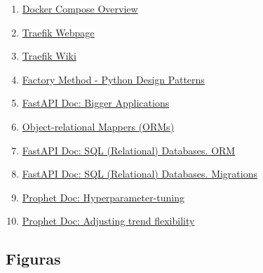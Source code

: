 \documentclass[a4paper, oneside, 12pt]{book}
\begin{document}
\begin{enumerate}
		\item
		\label{bib: docker compose doc}
		\href{https://docs.docker.com/compose/}{Docker Compose Overview}
		
		\item
		\label{bib: traefik webpage}
		\href{https://traefik.io/traefik/}{Traefik Webpage}
		
		\item
		\label{bib: traefik wiki}
		\href{https://doc.traefik.io/traefik/}{Traefik Wiki}
		
		\item
		\label{bib: factory method}
		\href{https://www.geeksforgeeks.org/factory-method-python-design-patterns/}{Factory Method - Python Design Patterns}
		
		\item
		\label{bib: fastapi doc bigger apps}
		\href{https://fastapi.tiangolo.com/tutorial/bigger-applications/}{FastAPI Doc: Bigger Applications}
		
		\item
		\label{bib: orm python}
		\href{https://www.fullstackpython.com/object-relational-mappers-orms.html}{Object-relational Mappers (ORMs)}
		
		\item
		\label{bib: fastapi orm}
		\href{https://fastapi.tiangolo.com/tutorial/sql-databases/#orms}{FastAPI Doc: SQL (Relational) Databases. ORM}
		
		\item
		\label{bib: fastapi migrations}
		\href{https://fastapi.tiangolo.com/tutorial/sql-databases/#migrations}{FastAPI Doc: SQL (Relational) Databases. Migrations}
		
		\item
		\label{bib: prophet parameters}
		\href{https://facebook.github.io/prophet/docs/diagnostics.html#hyperparameter-tuning}{Prophet Doc: Hyperparameter-tuning}
		
		\item
		\label{bib: prophet trend flex}
		\href{https://facebook.github.io/prophet/docs/trend_changepoints.html#adjusting-trend-flexibility}{Prophet Doc: Adjusting trend flexibility}
		
	\end{enumerate}

	\vspace{20px}
	
	\subsection*{Figuras}
\end{document}
